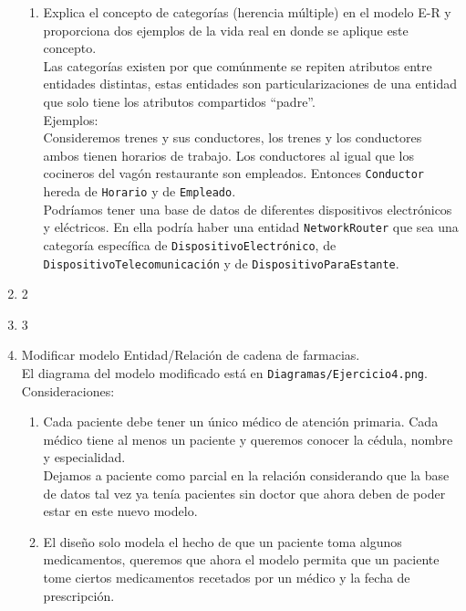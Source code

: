 \documentclass[12pt,a4paper]{article}
\begin{document}
\begin{enumerate}
\begin{enumerate}
			\item Explica el concepto de categorías (herencia múltiple) en el modelo E-R
				y proporciona dos ejemplos de la vida real en donde se aplique este concepto.\\

				Las categorías existen por que comúnmente se repiten atributos entre
				entidades distintas, estas entidades son particularizaciones de una entidad
				que solo tiene los atributos compartidos ``padre''.\\

				Ejemplos:\\
				Consideremos trenes y sus conductores, los trenes y los
				conductores ambos tienen horarios de trabajo. Los conductores
				al igual que los cocineros del vagón restaurante son empleados.
				Entonces \texttt{Conductor} hereda de \texttt{Horario} y de \texttt{Empleado}.\\

				Podríamos tener una base de datos de diferentes dispositivos electrónicos y eléctricos.
				En ella podría haber una entidad \texttt{NetworkRouter} que sea una categoría
				específica de \texttt{DispositivoElectrónico}, de \texttt{DispositivoTelecomunicación}
				y de \texttt{DispositivoParaEstante}.\\

		\end{enumerate}

	\item 2
	\item 3
	\item Modificar modelo Entidad/Relación de cadena de farmacias.\\
		El diagrama del modelo modificado está en \texttt{Diagramas/Ejercicio4.png}.\\

		Consideraciones:\\
		\begin{enumerate}
			\item Cada paciente debe tener un único médico de atención primaria. Cada médico tiene al menos un paciente
				y queremos conocer la cédula, nombre y especialidad.\\

				Dejamos a paciente como parcial en la relación considerando que
				la base de datos tal vez ya tenía pacientes sin doctor que ahora
				deben de poder estar en este nuevo modelo.\\

			\item El diseño solo modela el hecho de que un paciente toma algunos medicamentos, queremos que ahora el modelo
				permita que un paciente tome ciertos medicamentos recetados por un médico y la fecha de prescripción.\\


\end{enumerate}
\end{enumerate}
\end{document}
